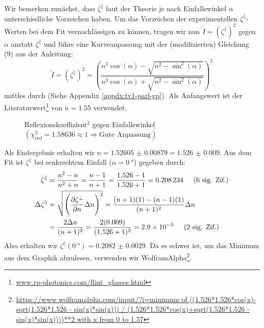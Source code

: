 		Wir bemerken zunächst, dass $\zeta^{\parallel}$ laut der Theorie je nach Einfallswinkel $\alpha$ unterschiedliche Vorzeichen haben. Um das Vorzeichen der experimentellen $\zeta^{\parallel}$-Werten bei dem Fit vernachlässigen zu können, tragen wir nun $\tilde{I} = \left(\zeta^{\parallel}\right)^2$ gegen $\alpha$ anstatt $\zeta^{\parallel}$ und führe eine Kurveanpassung mit der (modifizierten) Gleichung (9) aus der Anleitung:
		\begin{equation}
			\tilde{I} = \left(\zeta^{\parallel}\right)^2 = \left(\frac%
			{n^2\cos(\alpha) - \sqrt{n^2-\sin^2(\alpha)}}%
			{n^2\cos(\alpha) + \sqrt{n^2-\sin^2(\alpha)}}\right)^2
		\end{equation}
		mittles \gnuplot{} durch (Siehe Appendix \ref{appdx:tv1-parl-gp}). Als Anfangswert ist der Literaturwert\footnote{\href{https://www.rp-photonics.com/flint_glasses.html}{www.rp-photonics.com/flint\_glasses.html}} von $n=\num{1.55}$ verwendet. 
		\begin{figure}[H]
			\centering
			
			\caption{\centering Reflexionskoeffizient$^2$ gegen Einfallswinkel $(\chi^2_{\text{red}} = 1.58636 \approx 1 \Rightarrow \text{Gute Anpassung})$ }
			\label{fig:tvone-parl}
			\vspace{-1em}
		\end{figure}
		Als Endergebnis erhalten wir $n = \num{1.52605(879)} = \num{1.526(9)}$. Aus dem Fit ist $\zeta^\parallel$ bei senkrechtem Einfall ($\alpha = \SI{0}{\degree}$) gegeben durch:
		\begin{align}
			\zeta^\parallel &= \frac%
			{n^2 - n}%
			{n^2 + n} 
			= \frac{n-1}{n+1} = \frac{\num{1.526} - 1}{\num{1.526} + 1} = \num{0.208234} \sigfig{6}\\
			\Delta\zeta^\parallel &= \gausserror{\zeta^{\bot}}{n} = \frac{(n+1)(1) - (n-1)(1)}{(n+1)^2}\Delta n \notag \\
			&= \frac{2\Delta n}{(n+1)^2} = \frac{2(\num{0.009})}{(\num{1.526}+1)^2} = \num{2.9e-3} \sigfig{2}
		\end{align}
		Also erhalten wir $\zeta^\parallel(\SI{0}{\degree}) = \num{0.2082(29)}$. Da es schwer ist, um das Minimum aus dem Graphik abzulesen, verwenden wir WolframAlpha\footnote{\href{https://www.wolframalpha.com/input/?i=minimum+of+\%28\%281.526*1.526*cos\%28x\%29-sqrt\%281.526*1.526+-+sin\%28x\%29*sin\%28x\%29\%29\%29+\%2F+\%281.526*1.526*cos\%28x\%29\%2Bsqrt\%281.526*1.526+-+sin\%28x\%29*sin\%28x\%29\%29\%29\%29**2+with+x+from+0+to+1.57}{https://www.wolframalpha.com/input/?i=minimum of ((1.526*1.526*cos(x)-sqrt(1.526*1.526 - sin(x)*sin(x))) / (1.526*1.526*cos(x)+sqrt(1.526*1.526 - sin(x)*sin(x))))**2 with x from 0 to 1.57}}. 

